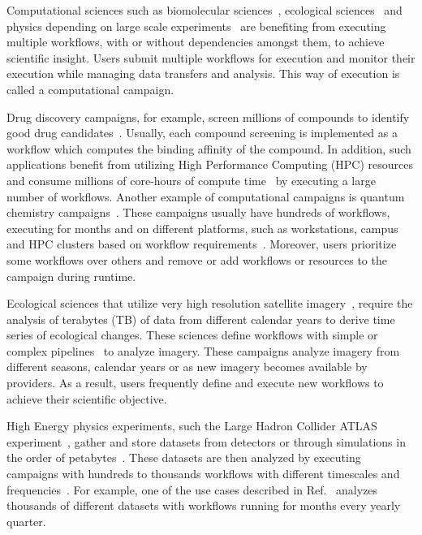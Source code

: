 \label{ch:intro}
Computational sciences such as biomolecular sciences~\cite{cheatham2015impact, dakka2018concurrent}, ecological sciences~\cite{goncalves2020sealnet, paraskevakos2019workflow} and physics depending on large scale experiments~\cite{atlas} are benefiting from executing multiple workflows, with or without dependencies amongst them, to achieve scientific insight.
Users submit multiple workflows for execution and monitor their execution while managing data transfers and analysis.
This way of execution is called a computational campaign.

Drug discovery campaigns, for example, screen millions of compounds to identify good drug candidates~\cite{dakka2018concurrent}.
Usually, each compound screening is implemented as a workflow which computes the binding affinity of the compound.
In addition, such applications benefit from utilizing High Performance Computing (HPC) resources and consume millions of core-hours of compute time~\cite{cheatham2015impact} by executing a large number of workflows.
Another example of computational campaigns is quantum chemistry campaigns~\cite{smith2020molssi}.
These campaigns usually have hundreds of workflows, executing for months and on different platforms, such as workstations, campus and HPC clusters based on workflow requirements~\cite{smith2020molssi}.
Moreover, users prioritize some workflows over others and remove or add workflows or resources to the campaign during runtime.

Ecological sciences that utilize very high resolution satellite imagery~\cite{goncalves2020sealnet}, require the analysis of terabytes (TB) of data from different calendar years to derive time series of ecological changes.
These sciences define workflows with simple or complex pipelines~\cite{paraskevakos2019workflow} to analyze imagery.
These campaigns  analyze imagery from different seasons, calendar years or as new imagery becomes available by providers.
As a result, users frequently define and execute new workflows to achieve their scientific objective.

High Energy physics experiments, such the Large Hadron Collider ATLAS experiment~\cite{atlas}, gather and store datasets from detectors or through simulations in the order of petabytes~\cite{borodin2015big}.
These datasets are then analyzed by executing campaigns with hundreds to thousands workflows with different timescales and frequencies~\cite{borodin2015big}.
For example, one of the use cases described in Ref.~\cite{borodin2015big} analyzes thousands of different datasets with workflows running for months every yearly quarter.


